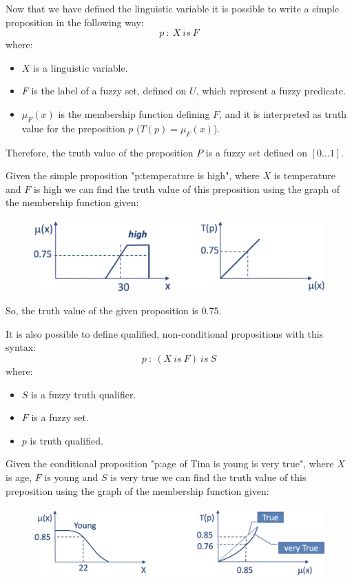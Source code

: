 \documentclass[12pt, a4paper]{report}
\newtheorem[L]{theorem}{Theorem}
\newtheorem[M]{corollary}{Corollary}
\newtheorem[M]{lemma}{Lemma}
\newtheorem[style=S,bodystyle=\normalfont]{definition}{Definition}
\begin{document}
    Now that we have defined the linguistic variable it is possible to write a simple proposition in the following way: 
    \[p\: : \: X \: is \: F\]
    where:
    \begin{itemize}
        \item $X$ is a linguistic variable.
        \item $F$ is the label of a fuzzy set, defined on $U$, which represent a fuzzy predicate.
        \item $\mu_F(x)$ is the membership function defining $F$, and it is interpreted as truth value for the preposition $p$ ($T(p)=\mu_F(x)$).
    \end{itemize}
    Therefore, the truth value of the preposition $P$ is a fuzzy set defined on $[0 \dots 1]$.
    \begin{example}
        Given the simple proposition "p:temperature is high", where $X$ is temperature and $F$ is high we can find the truth value of this 
        preposition using the graph of the membership function given:
        \begin{figure}[H]
            \centering
            \includegraphics[width=0.5\linewidth]{images/temperature.png}
        \end{figure}
        So, the truth value of the given proposition is $0.75$.
    \end{example}

    It is also possible to define qualified, non-conditional propositions with this syntax: 
    \[p \: : \: (X \: is \: F) \: is \: S\]
    where:
    \begin{itemize}
        \item $S$ is a fuzzy truth qualifier.
        \item $F$ is a fuzzy set.
        \item $p$ is truth qualified.
    \end{itemize}
    \begin{example}
        Given the conditional proposition "p:age of Tina is young is very true", where $X$ is age, $F$ is young and $S$ is very true we can 
        find the truth value of this preposition using the graph of the membership function given:
        \begin{figure}[H]
            \centering
            \includegraphics[width=0.75\linewidth]{images/age.png}
        \end{figure}
    \end{example}
\end{document}
